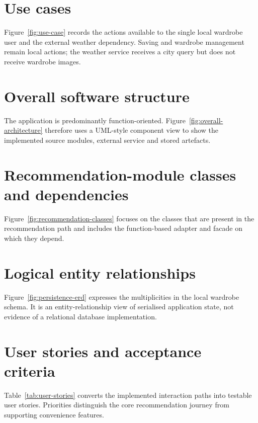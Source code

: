 \section{Use cases}

Figure~\ref{fig:use-case} records the actions available to the single local
wardrobe user and the external weather dependency. Saving and wardrobe
management remain local actions; the weather service receives a city query but
does not receive wardrobe images.



\section{Overall software structure}

The application is predominantly function-oriented.
Figure~\ref{fig:overall-architecture} therefore uses a UML-style component
view to show the implemented source modules, external service and stored
artefacts.



\section{Recommendation-module classes and dependencies}

Figure~\ref{fig:recommendation-classes} focuses on the classes that are present
in the recommendation path and includes the function-based adapter and facade
on which they depend.



\section{Logical entity relationships}

Figure~\ref{fig:persistence-erd} expresses the multiplicities in the local
wardrobe schema. It is an entity-relationship view of serialised application
state, not evidence of a relational database implementation.



\section{User stories and acceptance criteria}

Table~\ref{tab:user-stories} converts the implemented interaction paths into
testable user stories. Priorities distinguish the core recommendation journey
from supporting convenience features.

